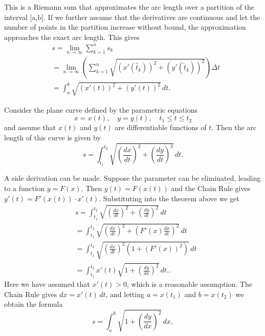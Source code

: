 \documentclass{report}
\begin{document}
    \pagebreak \bigbreak \noindent 
    This is a Riemann sum that approximates the arc length over a partition of the interval  [a,b]. If we further assume that the derivatives are continuous and let the number of points in the partition increase without bound, the approximation approaches the exact arc length. This gives
    \begin{align*}
        &s = \lim_{n \to \infty} \sum_{k=1}^{n} s_k  \\
        &= \lim_{n \to \infty} \left( \sum_{k=1}^{n} \sqrt{(x'(\hat{t}_k))^2 + (y'(\tilde{t}_k))^2} \right) \Delta t  \\
        &= \int_{a}^{b} \sqrt{(x'(t))^2 + (y'(t))^2} \, dt
    .\end{align*}
    \bigbreak \noindent 

    \bigbreak \noindent 
    \begin{thrmm}
        Consider the plane curve defined by the parametric equations
        \[
            x = x(t), \quad y = y(t), \quad t_1 \leq t \leq t_2
        \]
        and assume that \( x(t) \) and \( y(t) \) are differentiable functions of \( t \). Then the arc length of this curve is given by
        \[
            s = \int_{t_1}^{t_2} \sqrt{\left(\frac{dx}{dt}\right)^2 + \left(\frac{dy}{dt}\right)^2} \, dt.
        \]
    \end{thrmm}
    \bigbreak \noindent 
    A side derivation can be made. Suppose the parameter can be eliminated, leading to a function \( y = F(x) \). Then \( y(t) = F(x(t)) \) and the Chain Rule gives \( y'(t) = F'(x(t)) \cdot x'(t) \). Substituting into the theorem above we get 
    \begin{align*}
        &s = \int_{t_1}^{t_2} \sqrt{\left(\frac{dx}{dt}\right)^2 + \left(\frac{dy}{dt}\right)^2} \, dt  \\
        &= \int_{t_1}^{t_2} \sqrt{\left(\frac{dx}{dt}\right)^2 + \left(F'(x) \frac{dx}{dt}\right)^2} \, dt  \\
        &= \int_{t_1}^{t_2} \sqrt{\left(\frac{dx}{dt}\right)^2 \left(1 + (F'(x))^2\right)} \, dt  \\
        &= \int_{t_1}^{t_2} x'(t) \sqrt{1 + \left(\frac{dy}{dx}\right)^2} \, dt. 
    .\end{align*}
    \bigbreak \noindent 
    Here we have assumed that \( x'(t) > 0 \), which is a reasonable assumption. The Chain Rule gives \( dx = x'(t) \, dt \), and letting \( a = x(t_1) \) and \( b = x(t_2) \) we obtain the formula
    \[
    s = \int_{a}^{b} \sqrt{1 + \left(\frac{dy}{dx}\right)^2} \, dx,
    \]
\end{document}
